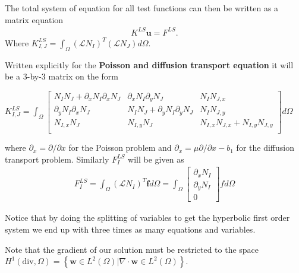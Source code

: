 The total system of equation for all test functions can then be written as a matrix equation 
\begin{align}
	K^{LS}\mathbf{u} = F^{LS}.
	\label{eq:matrixEq}
\end{align}
Where $K^{LS}_{I,J}=\int_{\Omega}(\mathcal{L}N_I)^T(\mathcal{L}N_J)d\Omega$. 

Written explicitly for the \textbf{Poisson and diffusion transport equation} it will be a 3-by-3 matrix on the form 

%
$
K^{LS}_{I,J} = \int_{\Omega}
\begin{bmatrix}
	N_IN_J + \partial_x N_{I} \partial_xN_{J} & \partial_x N_{I}\partial_y N_{J} & N_IN_{J,x} \\ 	
	\partial_yN_{I}\partial_xN_{J} &N_IN_J + \partial_yN_{I}\partial_yN_{J} &  N_IN_{J,y} \\ 	
	N_{I,x}N_J & N_{I,y}N_J & N_{I,x}N_{J,x} + N_{I,y}N_{J,y} \\ 	
	\label{mat:basicPoisson}
\end{bmatrix}
d\Omega
$
%

where $\partial_x = \partial / \partial x $ for the Poisson problem and $\partial_x = \mu \partial / \partial x - b_1$ for the diffusion transport problem. Similarly $F^{LS}_I$ will be given as 
\begin{align}
	F_I^{LS} = \int_{\Omega}(\mathcal{L}N_I)^T\mathbf{f} d\Omega = 
	\int_{\Omega}
\begin{bmatrix}
	\partial_xN_I \\
	\partial_yN_I \\
	0
\end{bmatrix}
	f d\Omega
	\label{eq:rhsFunctional}
\end{align}

Notice that by doing the splitting of variables to get the hyperbolic first order system we end up with three times as many equations and variables. 

Note that the gradient of our solution must be restricted to the space $H^1(\text{div},\Omega) = \left\{  \mathbf{w}\in L^2(\Omega) | \nabla \cdot \mathbf{w} \in L^2(\Omega)\right\} $. 
